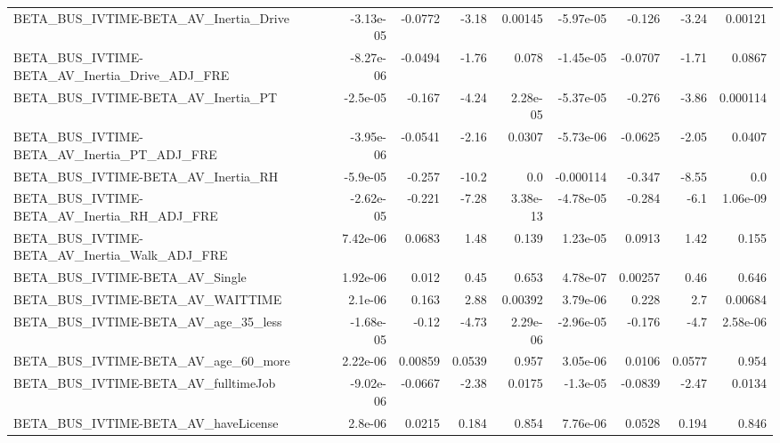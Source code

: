 \begin{tabular}{lrrrrrrrr}
BETA\_BUS\_IVTIME-BETA\_AV\_Inertia\_Drive              &   -3.13e-05 &      -0.0772 &    -3.18 &  0.00145 &  -5.97e-05 &      -0.126 &        -3.24 &       0.00121 \\
BETA\_BUS\_IVTIME-BETA\_AV\_Inertia\_Drive\_ADJ\_FRE      &   -8.27e-06 &      -0.0494 &    -1.76 &    0.078 &  -1.45e-05 &     -0.0707 &        -1.71 &        0.0867 \\
BETA\_BUS\_IVTIME-BETA\_AV\_Inertia\_PT                 &    -2.5e-05 &       -0.167 &    -4.24 & 2.28e-05 &  -5.37e-05 &      -0.276 &        -3.86 &      0.000114 \\
BETA\_BUS\_IVTIME-BETA\_AV\_Inertia\_PT\_ADJ\_FRE         &   -3.95e-06 &      -0.0541 &    -2.16 &   0.0307 &  -5.73e-06 &     -0.0625 &        -2.05 &        0.0407 \\
BETA\_BUS\_IVTIME-BETA\_AV\_Inertia\_RH                 &    -5.9e-05 &       -0.257 &    -10.2 &      0.0 &  -0.000114 &      -0.347 &        -8.55 &           0.0 \\
BETA\_BUS\_IVTIME-BETA\_AV\_Inertia\_RH\_ADJ\_FRE         &   -2.62e-05 &       -0.221 &    -7.28 & 3.38e-13 &  -4.78e-05 &      -0.284 &         -6.1 &      1.06e-09 \\
BETA\_BUS\_IVTIME-BETA\_AV\_Inertia\_Walk\_ADJ\_FRE       &    7.42e-06 &       0.0683 &     1.48 &    0.139 &   1.23e-05 &      0.0913 &         1.42 &         0.155 \\
BETA\_BUS\_IVTIME-BETA\_AV\_Single                     &    1.92e-06 &        0.012 &     0.45 &    0.653 &   4.78e-07 &     0.00257 &         0.46 &         0.646 \\
BETA\_BUS\_IVTIME-BETA\_AV\_WAITTIME                   &     2.1e-06 &        0.163 &     2.88 &  0.00392 &   3.79e-06 &       0.228 &          2.7 &       0.00684 \\
BETA\_BUS\_IVTIME-BETA\_AV\_age\_35\_less                &   -1.68e-05 &        -0.12 &    -4.73 & 2.29e-06 &  -2.96e-05 &      -0.176 &         -4.7 &      2.58e-06 \\
BETA\_BUS\_IVTIME-BETA\_AV\_age\_60\_more                &    2.22e-06 &      0.00859 &   0.0539 &    0.957 &   3.05e-06 &      0.0106 &       0.0577 &         0.954 \\
BETA\_BUS\_IVTIME-BETA\_AV\_fulltimeJob                &   -9.02e-06 &      -0.0667 &    -2.38 &   0.0175 &   -1.3e-05 &     -0.0839 &        -2.47 &        0.0134 \\
BETA\_BUS\_IVTIME-BETA\_AV\_haveLicense                &     2.8e-06 &       0.0215 &    0.184 &    0.854 &   7.76e-06 &      0.0528 &        0.194 &         0.846 \\

\end{tabular}
